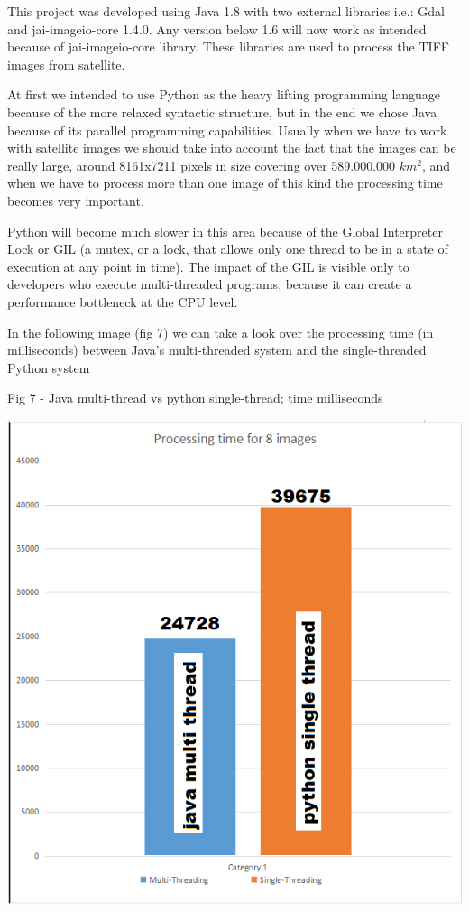 \documentclass[12pt, a4paper]{report}
\begin{document}
This project was developed using Java 1.8 with two external libraries i.e.: Gdal and jai-imageio-core 1.4.0. Any version below 1.6 will now work as intended because of jai-imageio-core library. These libraries are used to process the TIFF images from satellite.
\par

At first we intended to use Python as the heavy lifting programming language because of the more relaxed syntactic structure, but in the end we chose Java because of its parallel programming capabilities. Usually when we have to work with satellite images we should take into account the fact that the images can be really large, around 8161x7211 pixels in size covering over 589.000.000 $km^2$, and when we have to process more than one image of this kind the processing time becomes very important.
\par

Python will become much slower in this area because of the Global Interpreter Lock or GIL (a mutex, or a lock, that allows only one thread to be in a state of execution at any point in time). The impact of the GIL is visible only to developers who execute multi-threaded programs, because it can create a performance bottleneck at the CPU level.
 \par
 
\bigskip

In the following image (fig 7) we can take a look over the processing time (in milliseconds) between Java's multi-threaded system and the single-threaded Python system
\par

\bigskip

\begin{center}
Fig 7 - Java multi-thread vs python single-thread; time milliseconds
\end{center}
\par 
\includegraphics[scale=0.7, center]{multi_thread2.png}
\end{document}
